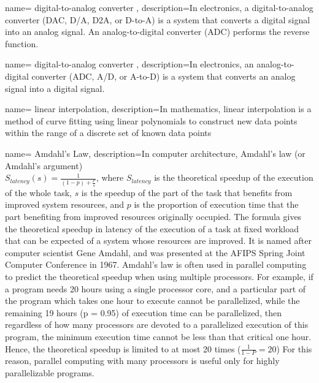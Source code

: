 {
        name= digital-to-analog converter ,
        description={In electronics, a digital-to-analog converter (DAC, D/A, D2A, or D-to-A) is a system that converts a digital signal into an analog signal. An analog-to-digital converter (ADC) performs the reverse function.}
}

{
        name= digital-to-analog converter ,
        description={In electronics, an analog-to-digital converter (ADC, A/D, or A-to-D) is a system that converts an analog signal into a digital signal.}
}

{
        name= linear interpolation,
        description={In mathematics, linear interpolation is a method of curve fitting using linear polynomials to construct new data points within the range of a discrete set of known data points}
}

{
        name= Amdahl's Law,
        description={In computer architecture, Amdahl's law (or Amdahl's argument) \\ $S_{latency}(s)=\frac{1}{(1-p)+\frac{p}{s}}$, where $S_{latency}$ is the theoretical speedup of the execution of the whole task, $s$ is the speedup of the part of the task that benefits from improved system resources, and $p$ is the proportion of execution time that the part benefiting from improved resources originally occupied. The formula gives the theoretical speedup in latency of the execution of a task at fixed workload that can be expected of a system whose resources are improved. It is named after computer scientist Gene Amdahl, and was presented at the AFIPS Spring Joint Computer Conference in 1967. Amdahl's law is often used in parallel computing to predict the theoretical speedup when using multiple processors. For example, if a program needs 20 hours using a single processor core, and a particular part of the program which takes one hour to execute cannot be parallelized, while the remaining 19 hours (p = 0.95) of execution time can be parallelized, then regardless of how many processors are devoted to a parallelized execution of this program, the minimum execution time cannot be less than that critical one hour. Hence, the theoretical speedup is limited to at most 20 times ($\frac{1}{1-P}=20$) For this reason, parallel computing with many processors is useful only for highly parallelizable programs.}
}

